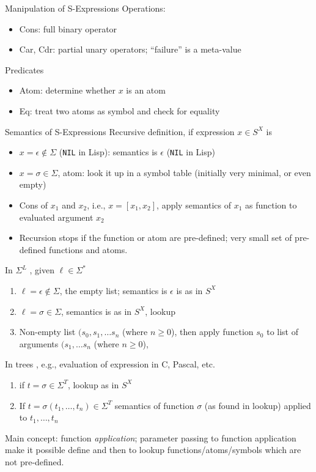 \documentclass[aspectratio=169]{beamer}
\begin{document}
\begin{frame}{Manipulation of S-Expressions}
Operations:
\begin{itemize}
\item Cons: full binary operator 
\item Car, Cdr: partial unary operators; ``failure'' is a meta-value
\end{itemize}
Predicates
\begin{itemize}
\item Atom: determine whether $x$ is an atom  
\item Eq: treat two atoms as symbol and check for equality
\end{itemize}
\end{frame}

\begin{frame}{Semantics of S-Expressions}
Recursive definition, if expression $x\in S^X$ is
\scriptsize
\begin{itemize}
\item $x = \epsilon\not\in\Sigma$ (\texttt{NIL} in Lisp): semantics is $\epsilon$ 
    (\texttt{NIL} in Lisp)
    
\item $x = \sigma\in\Sigma$,  atom: look it up in a symbol table (initially very minimal, or even empty) 
\item Cons of $x_1$ and $x_2$, i.e., $x= [x_1,x_2]$, apply semantics of $x_1$ as function to evaluated argument $x_2$
\item Recursion stops if the function or atom are pre-defined; very small set of pre-defined functions and atoms.
\end{itemize}
In $\Sigma^L$ , given $\ell\in\Sigma^*$
\begin{enumerate}
\item $\ell = \epsilon\not\in\Sigma$, the empty list;  semantics is $\epsilon$ 
    is as in $S^X$
\item $\ell = \sigma\in\Sigma$,  semantics  is as in $S^X$, lookup
\item Non-empty list $(s_0,s_1,\ldots s_n$ (where $n\ge0$),
    then apply function $s_0$ to list of arguments $(s_1,\ldots s_n$ (where $n\ge0$),
\end{enumerate}
In trees , e.g., evaluation of expression in C, Pascal, etc.
\begin{enumerate}
\item if $t=\sigma\in\Sigma^T$, lookup as in $S^X$
        \item If $t= \sigma(t_1,\ldots,t_n) \in \Sigma^T$ semantics
        of function $\sigma$ (as found in lookup) applied to $t_1,\ldots,t_n$
\end{enumerate}
Main concept: function \emph{application}; parameter passing to function application
make it possible define and then to lookup functions/atoms/symbols which are not pre-defined.
\end{frame}
\end{document}

